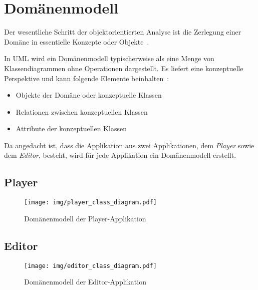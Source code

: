 
\section{Domänenmodell}
\label{sec:domain-model}

Der wesentliche Schritt der objektorientierten Analyse ist die Zerlegung einer
Domäne in essentielle Konzepte oder Objekte~\cite{larman_applying_2004}.

In UML wird ein Domänenmodell typischerweise als eine Menge von
Klassendiagrammen ohne Operationen dargestellt. Es liefert eine konzeptuelle
Perspektive und kann folgende Elemente beinhalten~\cite{larman_applying_2004}:
\begin{itemize}
    \item{Objekte der Domäne oder konzeptuelle Klassen}
    \item{Relationen zwischen konzeptuellen Klassen}
    \item{Attribute der konzeptuellen Klassen}
\end{itemize}

Da angedacht ist, dass die Applikation aus zwei Applikationen, dem
\textit{Player} sowie dem \textit{Editor}, besteht, wird für jede
Applikation ein Domänenmodell erstellt.

\subsection{Player}
\label{subsec:domain-model:player}

\begin{figure}[H]
    \centering
    \texttt{[image: img/player\_class\_diagram.pdf]}
    \caption{Domänenmodell der
        Player-Applikation\protect\footnotemark}\label{fig:domain-model:player}
\end{figure}


\subsection{Editor}
\label{subsec:domain-model:editor}

\begin{figure}[H]
    \centering
    \texttt{[image: img/editor\_class\_diagram.pdf]}
    \caption{Domänenmodell der
        Editor-Applikation\protect\footnotemark}\label{fig:domain-model:editor}
\end{figure}

